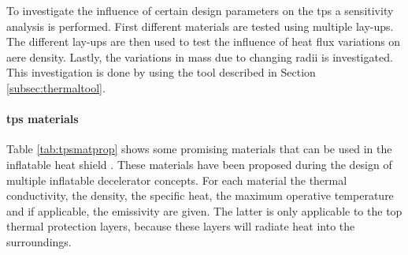 To investigate the influence of certain design parameters on the \gls{tps} a sensitivity analysis is performed. First different materials are tested using multiple lay-ups. The different lay-ups are then used to test the influence of heat flux variations on aere density. Lastly, the variations in mass due to changing radii is investigated. This investigation is done by using the tool described in Section \ref{subsec:thermaltool}.

\paragraph{\gls{tps} materials}
Table \ref{tab:tpsmatprop} shows some promising materials that can be used in the inflatable heat shield \cite{Corso2009,Corso2011,DuPont2011,Smith2011}. These materials have been proposed during the design of multiple inflatable decelerator concepts. For each material the thermal conductivity, the density, the specific heat, the maximum operative temperature and if applicable, the emissivity are given. The latter is only applicable to the top  thermal protection layers, because these layers will radiate heat into the surroundings.

